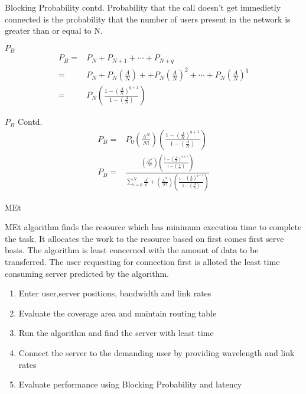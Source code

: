 \documentclass{beamer}
\providecommand{\brak}[1]{\ensuremath{\left(#1\right)}}
\begin{document}
\begin{frame}{Blocking Probability contd.}
  Probability that the call doesn't get immedietly connected is the probability that
  the number of users present in the network is greater than or equal to N.
  \begin{block}{$P_B$}
    \begin{align}
      P_B = & P_N + P_{N+1} + \cdots +P_{N+q}                                                              \\[0.2cm]
      =     & P_N + P_N \brak{\frac{A}{N}} + + P_N \brak{\frac{A}{N}}^2 +\cdots + P_N \brak{\frac{A}{N}}^q \\[0.2cm]
      =     & P_N\brak{\frac{1-\brak{\frac{A}{N}}^{q+1}}{1-\brak{\frac{A}{N}}}}
    \end{align}
  \end{block}
\end{frame}
\begin{frame}
  \begin{block}{$P_B$ Contd.}
    \begin{align}
      P_B = & P_0 \brak{\frac{A^N}{N!}} \brak{\frac{1-\brak{\frac{A}{N}}^{q+1}}{1-\brak{\frac{A}{N}}}}                                                                                                      \\[0.3cm]
      P_B = & \frac{\brak{\frac{A^N}{N!}} \brak{\frac{1-\brak{\frac{A}{N}}^{q+1}}{1-\brak{\frac{A}{N}}}}}{\sum_{i = 0}^{N} \frac{A^i}{i!} + \brak{\frac{A^N}{N!}} \brak{\frac{1-\brak{\frac{A}{N}}^{q+1}}{1-\brak{\frac{A}{N}}}}}
    \end{align}
  \end{block}
\end{frame}
\begin{frame}{MEt}
  \begin{block}{}
    MEt algorithm finds the resource which has minimum execution time to complete the task.
    It allocates the work to the resource based on first comes first serve basis.
    The algorithm is least concerned with the amount of data to be transferred.
    The user requesting for connection first is alloted the least time consuming server predicted by the algorithm.
  \end{block}
  \begin{enumerate}
    \item Enter user,server positions, bandwidth and link rates
    \item Evaluate the coverage area and maintain routing table
    \item Run the algorithm and find the server with least time 
    \item Connect the server to the demanding user by providing wavelength and link rates
    \item Evaluate performance using Blocking Probability and latency
  \end{enumerate}
\end{frame}
\end{document}
